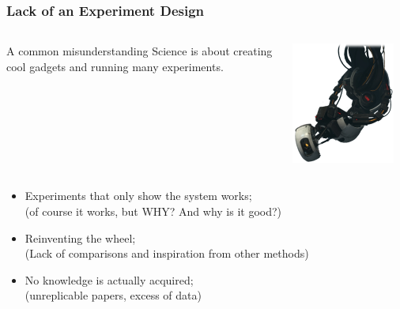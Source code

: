\documentclass{beamer}
\begin{document}
\begin{frame}
  \frametitle{Lack of an Experiment Design}
  \begin{columns}[c]
    \begin{block}{A common misunderstanding}
      Science is about creating cool gadgets and running many experiments.
    \end{block}
    \includegraphics[width=0.9\textwidth]{img/glados.png}
  \end{columns}
  \vfill

  \begin{itemize}
  \item<2-> Experiments that only show the system works;\\
    {\small (of course it works, but WHY? And why is it good?)}
  \item<3-> Reinventing the wheel;\\ 
    {\small(Lack of comparisons and inspiration from other methods)}
  \item<4-> No knowledge is actually acquired;\\
    {\small(unreplicable papers, excess of data)}
  \end{itemize}
\end{frame}
\end{document}
